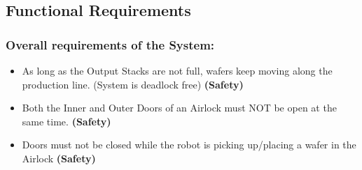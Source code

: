 \documentclass[a4paper,12pt]{article}
\begin{document}
\subsection{Functional Requirements}
\subsubsection{Overall requirements of the System:}
\begin{itemize}
\item As long as the Output Stacks are not full, wafers keep moving along the production line. (System is deadlock free) \textbf{(Safety)}
\item Both the Inner and Outer Doors of an Airlock must NOT be open at the same time.\textbf{ (Safety)}
\item Doors must not be closed while the robot is picking up/placing a wafer in the Airlock\textbf{ (Safety)}
\end{itemize}
\end{document}
